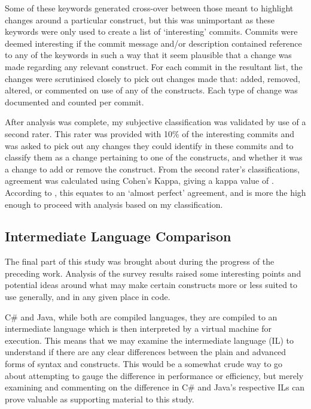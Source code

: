 \documentclass{article}
\begin{document}
        Some of these keywords generated cross-over between those meant to highlight changes around a particular construct, but this was unimportant as these keywords were only used to create a list of  `interesting' commits. Commits were deemed interesting if the commit message and/or description contained reference to any of the keywords in such a way that it seem plausible that a change was made regarding any relevant construct. For each commit in the resultant list, the changes were scrutinised closely to pick out changes made that: added, removed, altered, or commented on use of any of the constructs. Each type of change was documented and counted per commit.

        After analysis was complete, my subjective classification was validated by use of a second rater. This rater was provided with 10\% of the interesting commits and was asked to pick out any changes they could identify in these commits and to classify them as a change pertaining to one of the constructs, and whether it was a change to add or remove the construct. From the second rater's classifications, agreement was calculated using Cohen's Kappa, giving a kappa value of . According to \cite{cohensKappa}, this equates to an `almost perfect' agreement, and is more the high enough to proceed with analysis based on my classification.

    \subsection{Intermediate Language Comparison}
        The final part of this study was brought about during the progress of the preceding work. Analysis of the survey results raised some interesting points and potential ideas around what may make certain constructs more or less suited to use generally, and in any given place in code.

        C\# and Java, while both are compiled languages, they are compiled to an intermediate language which is then interpreted by a virtual machine for execution. This means that we may examine the intermediate language (IL) to understand if there are any clear differences between the plain and advanced forms of syntax and constructs. This would be a somewhat crude way to go about attempting to gauge the difference in performance or efficiency, but merely examining and commenting on the difference in C\# and Java's respective ILs can prove valuable as supporting material to this study.
        
\end{document}
